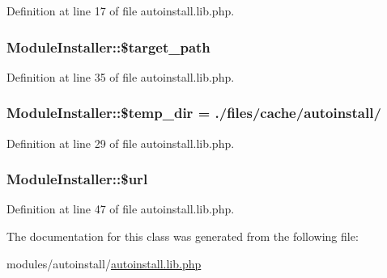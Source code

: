 Definition at line 17 of file autoinstall.\+lib.\+php.

\subsubsection[{\texorpdfstring{\$target\+\_\+path}{$target_path}}]{\setlength{\rightskip}{0pt plus 5cm}Module\+Installer\+::\$target\+\_\+path}\hypertarget{classModuleInstaller_ac689b9d90b9845e4edb9726e5a0c1fd5}{}\label{classModuleInstaller_ac689b9d90b9845e4edb9726e5a0c1fd5}


Definition at line 35 of file autoinstall.\+lib.\+php.

\subsubsection[{\texorpdfstring{\$temp\+\_\+dir}{$temp_dir}}]{\setlength{\rightskip}{0pt plus 5cm}Module\+Installer\+::\$temp\+\_\+dir = \textquotesingle{}./{\bf files}/cache/{\bf autoinstall}/\textquotesingle{}}\hypertarget{classModuleInstaller_a65850d513e6f6fdae18ee0654efb956c}{}\label{classModuleInstaller_a65850d513e6f6fdae18ee0654efb956c}


Definition at line 29 of file autoinstall.\+lib.\+php.

\subsubsection[{\texorpdfstring{\$url}{$url}}]{\setlength{\rightskip}{0pt plus 5cm}Module\+Installer\+::\$url}\hypertarget{classModuleInstaller_a01a6bf5f232c00fff146a58fb8c14b84}{}\label{classModuleInstaller_a01a6bf5f232c00fff146a58fb8c14b84}


Definition at line 47 of file autoinstall.\+lib.\+php.



The documentation for this class was generated from the following file\+:\begin{DoxyCompactItemize}
\item 
modules/autoinstall/\hyperlink{autoinstall_8lib_8php}{autoinstall.\+lib.\+php}\end{DoxyCompactItemize}
